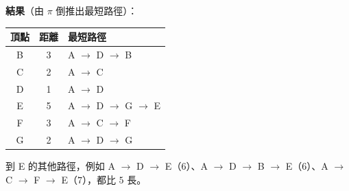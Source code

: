 \begin{pastsoln}
\textbf{結果}（由 $\pi$ 倒推出最短路徑）：
\begin{center}
\begin{tabular}{ccl}
\toprule
頂點 & 距離 & 最短路徑 \\
\midrule
B & 3 & A $\to$ D $\to$ B \\
C & 2 & A $\to$ C \\
D & 1 & A $\to$ D \\
E & 5 & A $\to$ D $\to$ G $\to$ E \\
F & 3 & A $\to$ C $\to$ F \\
G & 2 & A $\to$ D $\to$ G \\
\bottomrule
\end{tabular}
\end{center}
到 E 的其他路徑，例如 A $\to$ D $\to$ E（$6$）、A $\to$ D $\to$ B $\to$ E（$6$）、A $\to$ C $\to$ F $\to$ E（$7$），都比 $5$ 長。
\end{pastsoln}

